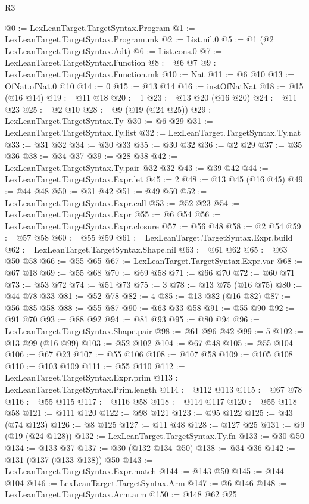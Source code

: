 \begin{lexlean}{R3}
\begin{coremodule}
@0 := LexLeanTarget.TargetSyntax.Program
@1 := LexLeanTarget.TargetSyntax.Program.mk
@2 := List.nil.{0}
@5 := @1 (@2 LexLeanTarget.TargetSyntax.Adt)
@6 := List.cons.{0}
@7 := LexLeanTarget.TargetSyntax.Function
@8 := @6 @7
@9 := LexLeanTarget.TargetSyntax.Function.mk
@10 := Nat
@11 := @6 @10
@13 := OfNat.ofNat.{0} @10
@14 := 0
@15 := @13 @14
@16 := instOfNatNat
@18 := @15 (@16 @14)
@19 := @11 @18
@20 := 1
@23 := @13 @20 (@16 @20)
@24 := @11 @23
@25 := @2 @10
@28 := @9 (@19 (@24 @25))
@29 := LexLeanTarget.TargetSyntax.Ty
@30 := @6 @29
@31 := LexLeanTarget.TargetSyntax.Ty.list
@32 := LexLeanTarget.TargetSyntax.Ty.nat
@33 := @31 @32
@34 := @30 @33
@35 := @30 @32
@36 := @2 @29
@37 := @35 @36
@38 := @34 @37
@39 := @28 @38
@42 := LexLeanTarget.TargetSyntax.Ty.pair @32 @32
@43 := @39 @42
@44 := LexLeanTarget.TargetSyntax.Expr.let
@45 := 2
@48 := @13 @45 (@16 @45)
@49 := @44 @48
@50 := @31 @42
@51 := @49 @50
@52 := LexLeanTarget.TargetSyntax.Expr.call
@53 := @52 @23
@54 := LexLeanTarget.TargetSyntax.Expr
@55 := @6 @54
@56 := LexLeanTarget.TargetSyntax.Expr.closure
@57 := @56 @48
@58 := @2 @54
@59 := @57 @58
@60 := @55 @59
@61 := LexLeanTarget.TargetSyntax.Expr.build
@62 := LexLeanTarget.TargetSyntax.Shape.nil
@63 := @61 @62
@65 := @63 @50 @58
@66 := @55 @65
@67 := LexLeanTarget.TargetSyntax.Expr.var
@68 := @67 @18
@69 := @55 @68
@70 := @69 @58
@71 := @66 @70
@72 := @60 @71
@73 := @53 @72
@74 := @51 @73
@75 := 3
@78 := @13 @75 (@16 @75)
@80 := @44 @78 @33
@81 := @52 @78
@82 := 4
@85 := @13 @82 (@16 @82)
@87 := @56 @85 @58
@88 := @55 @87
@90 := @63 @33 @58
@91 := @55 @90
@92 := @91 @70
@93 := @88 @92
@94 := @81 @93
@95 := @80 @94
@96 := LexLeanTarget.TargetSyntax.Shape.pair
@98 := @61 @96 @42
@99 := 5
@102 := @13 @99 (@16 @99)
@103 := @52 @102
@104 := @67 @48
@105 := @55 @104
@106 := @67 @23
@107 := @55 @106
@108 := @107 @58
@109 := @105 @108
@110 := @103 @109
@111 := @55 @110
@112 := LexLeanTarget.TargetSyntax.Expr.prim
@113 := LexLeanTarget.TargetSyntax.Prim.length
@114 := @112 @113
@115 := @67 @78
@116 := @55 @115
@117 := @116 @58
@118 := @114 @117
@120 := @55 @118 @58
@121 := @111 @120
@122 := @98 @121
@123 := @95 @122
@125 := @43 (@74 @123)
@126 := @8 @125
@127 := @11 @48
@128 := @127 @25
@131 := @9 (@19 (@24 @128))
@132 := LexLeanTarget.TargetSyntax.Ty.fn
@133 := @30 @50
@134 := @133 @37
@137 := @30 (@132 @134 @50)
@138 := @34 @36
@142 := @131 (@137 (@133 @138)) @50
@143 := LexLeanTarget.TargetSyntax.Expr.match
@144 := @143 @50
@145 := @144 @104
@146 := LexLeanTarget.TargetSyntax.Arm
@147 := @6 @146
@148 := LexLeanTarget.TargetSyntax.Arm.arm
@150 := @148 @62 @25

\end{coremodule}
\end{lexlean}
